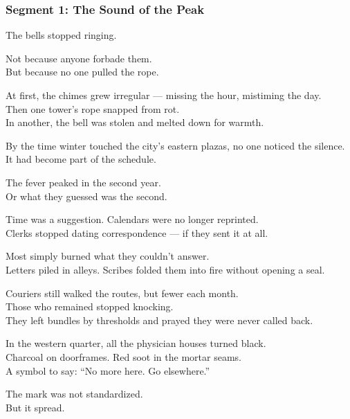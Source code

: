 \documentclass[9pt]{article}
\begin{document}
\newpage

\subsubsection*{Segment 1: The Sound of the Peak}

The bells stopped ringing.

Not because anyone forbade them.\\
But because no one pulled the rope.

At first, the chimes grew irregular — missing the hour, mistiming the day.\\
Then one tower’s rope snapped from rot.\\
In another, the bell was stolen and melted down for warmth.

By the time winter touched the city’s eastern plazas, no one noticed the silence.\\
It had become part of the schedule.

\vspace{1em}

The fever peaked in the second year.\\
Or what they guessed was the second.

Time was a suggestion. Calendars were no longer reprinted.\\
Clerks stopped dating correspondence — if they sent it at all.

Most simply burned what they couldn’t answer.\\
Letters piled in alleys. Scribes folded them into fire without opening a seal.

\vspace{1em}

Couriers still walked the routes, but fewer each month.\\
Those who remained stopped knocking.\\
They left bundles by thresholds and prayed they were never called back.

\vspace{1em}

In the western quarter, all the physician houses turned black.\\
Charcoal on doorframes. Red soot in the mortar seams.\\
A symbol to say: “No more here. Go elsewhere.”

The mark was not standardized.\\
But it spread.

\vspace{1em}
\end{document}
